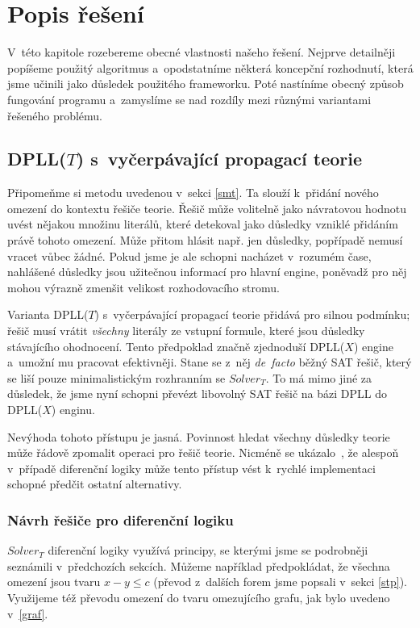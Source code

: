 \chapter{Popis řešení}

V~této kapitole rozebereme obecné vlastnosti našeho řešení. Nejprve detailněji popíšeme použitý algoritmus a~opodstatníme některá koncepční rozhodnutí, která jsme učinili jako důsledek použitého frameworku. Poté nastíníme obecný způsob fungování programu a~zamyslíme se nad rozdíly mezi různými variantami řešeného problému.

\section{DPLL($T$) s~vyčerpávající propagací teorie}

Připomeňme si metodu  uvedenou v~sekci \ref{smt}. Ta slouží k~přidání nového omezení do kontextu řešiče teorie. Řešič může volitelně jako návratovou hodnotu uvést nějakou množinu literálů, které detekoval jako důsledky vzniklé přidáním právě tohoto omezení. Může přitom hlásit např. jen  důsledky, popřípadě nemusí vracet vůbec žádné. Pokud jsme je ale schopni nacházet v~rozumém čase, nahlášené důsledky jsou užitečnou informací pro hlavní engine, poněvadž pro něj mohou výrazně zmenšit velikost rozhodovacího stromu.

Varianta DPLL($T$) s~vyčerpávající propagací teorie přidává pro  silnou podmínku; řešič musí vrátit \emph{všechny} literály ze vstupní formule, které jsou důsledky stávajícího ohodnocení. Tento předpoklad značně zjednoduší DPLL($X$) engine a~umožní mu pracovat efektivněji. Stane se z~něj \emph{de~facto} běžný SAT řešič, který se liší pouze minimalistickým rozhranním se $Solver_T$. To má mimo jiné za důsledek, že jsme nyní schopni převézt libovolný SAT řešič na bázi DPLL do DPLL($X$) enginu.

Nevýhoda tohoto přístupu je jasná. Povinnost hledat všechny důsledky teorie může řádově zpomalit operaci  pro řešič teorie. Nicméně se ukázalo~\cite{Nieuwenhuis05}, že alespoň v~případě diferenční logiky může tento přístup vést k~rychlé implementaci schopné předčit ostatní alternativy.

\subsection{Návrh řešiče pro diferenční logiku}

$Solver_T$ diferenční logiky využívá principy, se kterými jsme se podrobněji seznámili v~předchozích sekcích. Můžeme například předpokládat, že všechna omezení jsou tvaru $x-y \leq c$ (převod z~dalších forem jsme popsali v~sekci \ref{stp}). Využijeme též převodu omezení do tvaru omezujícího grafu, jak bylo uvedeno v~\ref{graf}.

